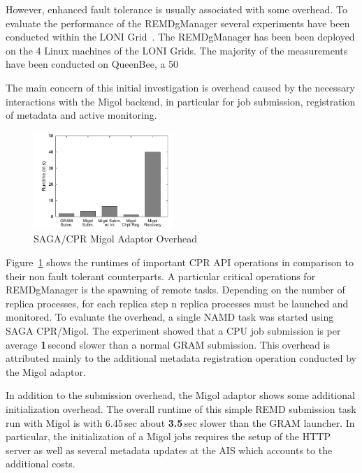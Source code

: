 \documentclass[times, 10pt,twocolumn]{article}
\begin{document}
However, enhanced fault tolerance is usually associated with some overhead. To evaluate the performance of the REMDgManager several experiments have been conducted within the LONI Grid~\cite{Allen:2003xy}. The REMDgManager has been been deployed on the 4 Linux machines of the LONI Grids. The majority of the measurements have been conducted on QueenBee, a 50

The main concern of this initial investigation is overhead caused by the necessary interactions with the Migol backend, in particular for job submission, registration of metadata and active monitoring.
\begin{figure}[htbp]
    \centering
        \includegraphics[width=0.47\textwidth]{performance/perf_submission.pdf}
    \caption{SAGA/CPR Migol Adaptor Overhead}
    \label{fig:performance_perf_submission}
\end{figure}           
Figure~\ref{fig:performance_perf_submission} shows the runtimes of important CPR API operations in comparison to their non fault tolerant counterparts. A particular critical operations for REMDgManager is the spawning of remote tasks. Depending on the number of replica processes, for each replica step n replica processes must be launched and monitored.  To evaluate the overhead, a single NAMD task was started using SAGA CPR/Migol.  The experiment showed that a CPU job submission is per average \textbf{1}\,second slower than a normal GRAM submission. This overhead is attributed mainly to the additional metadata registration operation conducted by the Migol adaptor. 

In addition to the submission overhead, the Migol adaptor shows some additional initialization overhead. The overall runtime of this simple REMD submission task run with Migol is with 6.45\,sec about \textbf{3.5}\,sec slower than the GRAM launcher. In particular, the initialization of a Migol jobs requires the setup of the HTTP server as well as several metadata updates at the AIS which accounts to the additional costs.
                                                                                                                      
\end{document}
